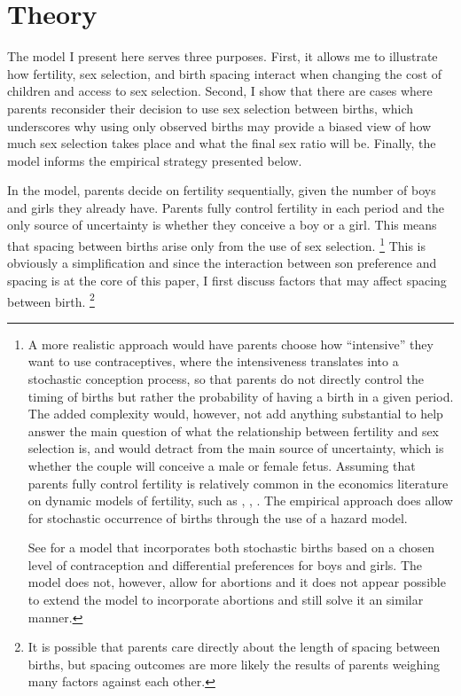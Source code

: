 \documentclass[12pt,letterpaper]{article}
\begin{document}






\section{Theory\label{sec:model}}

The model I present here serves three purposes.
First, it allows me to illustrate how fertility, sex selection, and birth 
spacing interact when changing the cost of children and access to sex selection.
Second, I show that there are cases where parents reconsider their decision to 
use sex selection between births, which underscores why 
using only observed births may provide a biased view of how much
sex selection takes place and what the final sex ratio will be.
Finally, the model informs the empirical strategy presented below.

In the model, parents decide on fertility sequentially,
given the number of boys and girls they already have.
Parents fully control fertility in each period and the only
source of uncertainty is whether they conceive a boy or a girl.
This means that spacing between births arise only from 
the use of sex selection.%
\footnote{
A more realistic approach would have parents choose how 
``intensive'' they want to use contraceptives, where the
intensiveness translates into a stochastic conception process,
so that parents do not directly control the timing of births 
but rather the probability of having a birth in a given period.
The added complexity would, however, not add anything substantial 
to help answer the main question of what the relationship between fertility 
and sex selection is, and would detract from the main source of uncertainty,
which is whether the couple will conceive a male or female fetus.
Assuming that parents fully control fertility is relatively common 
in the economics literature on dynamic models of fertility, such as
\citet{Happel1984}, \citet{wolpin84}, \citet{rosenzweig85}.
The empirical approach does allow for stochastic occurrence of births
through the use of a hazard model.

See \citet{Leung1991} for a model that incorporates both stochastic 
births based on a chosen level of contraception and differential 
preferences for boys and girls.
The model does not, however, allow for abortions and it does
not appear possible to extend the model to incorporate abortions
and still solve it an similar manner.
}
This is obviously a simplification and since the interaction
between son preference and spacing is at the core of this paper,
I first discuss factors that may affect spacing between birth.%
\footnote{
It is possible that parents care directly about the
length of spacing between births, but 
spacing outcomes are more likely the results of parents weighing many
factors against each other.
}
\end{document}
